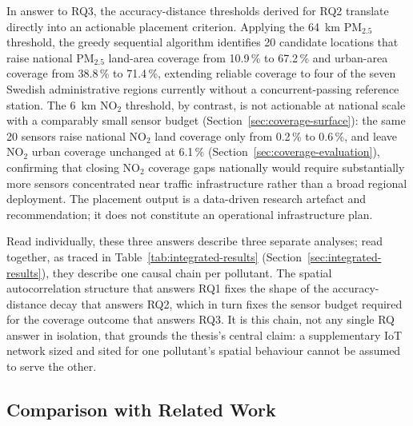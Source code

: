 \documentclass[11pt,a4paper]{article}
\let\oldsubsection\subsection
\renewcommand{\subsection}{\FloatBarrier\oldsubsection}
\begin{document}
In answer to RQ3, the accuracy-distance thresholds derived for RQ2 translate directly into an actionable placement criterion. Applying the 64~km PM$_{2.5}$ threshold, the greedy sequential algorithm identifies 20 candidate locations that raise national PM$_{2.5}$ land-area coverage from 10.9\,\% to 67.2\,\% and urban-area coverage from 38.8\,\% to 71.4\,\%, extending reliable coverage to four of the seven Swedish administrative regions currently without a concurrent-passing reference station. The 6~km NO$_2$ threshold, by contrast, is not actionable at national scale with a comparably small sensor budget (Section~\ref{sec:coverage-surface}): the same 20 sensors raise national NO$_2$ land coverage only from 0.2\,\% to 0.6\,\%, and leave NO$_2$ urban coverage unchanged at 6.1\,\% (Section~\ref{sec:coverage-evaluation}), confirming that closing NO$_2$ coverage gaps nationally would require substantially more sensors concentrated near traffic infrastructure rather than a broad regional deployment. The placement output is a data-driven research artefact and recommendation; it does not constitute an operational infrastructure plan.

Read individually, these three answers describe three separate analyses; read together, as traced in Table~\ref{tab:integrated-results} (Section~\ref{sec:integrated-results}), they describe one causal chain per pollutant. The spatial autocorrelation structure that answers RQ1 fixes the shape of the accuracy-distance decay that answers RQ2, which in turn fixes the sensor budget required for the coverage outcome that answers RQ3. It is this chain, not any single RQ answer in isolation, that grounds the thesis's central claim: a supplementary IoT network sized and sited for one pollutant's spatial behaviour cannot be assumed to serve the other.

\subsection{Comparison with Related Work}
\label{sec:discussion-related}
\end{document}
